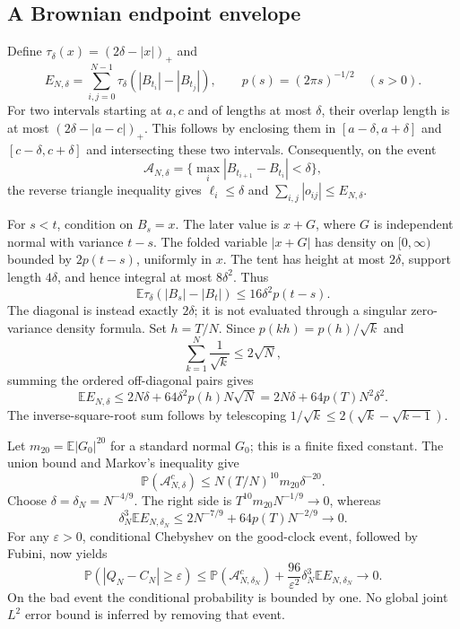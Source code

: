 \documentclass[11pt]{article}
\theoremstyle{remark}\newtheorem{remark}[theorem]{Remark}
\begin{document}
\subsection*{A Brownian endpoint envelope}
Define $\tau_\delta(x)=(2\delta-|x|)_+$ and
\[
 E_{N,\delta}=\sum_{i,j=0}^{N-1}
       \tau_\delta(|B_{t_i}|-|B_{t_j}|),\qquad
 p(s)=(2\pi s)^{-1/2}\quad(s>0).
\]
For two intervals starting at $a,c$ and of lengths at most
$\delta$, their overlap length is at most
$(2\delta-|a-c|)_+$. This follows by enclosing them in
$[a-\delta,a+\delta]$ and $[c-\delta,c+\delta]$ and intersecting
these two intervals. Consequently, on the event
\[
 \mathcal A_{N,\delta}
 =\{\max_i|B_{t_{i+1}}-B_{t_i}|<\delta\},
\]
the reverse triangle inequality gives $\ell_i\leq\delta$ and
$\sum_{i,j}|o_{ij}|\leq E_{N,\delta}$.

For $s<t$, condition on $B_s=x$. The later value is $x+G$, where
$G$ is independent normal with variance $t-s$. The folded variable
$|x+G|$ has density on $[0,\infty)$ bounded by $2p(t-s)$,
uniformly in $x$. The tent has height at most $2\delta$, support
length $4\delta$, and hence integral at most $8\delta^2$.
Thus
\begin{equation}\label{eq:tentmean}
 \mathbb E\tau_\delta(|B_s|-|B_t|)
 \leq16\delta^2p(t-s).
\end{equation}
The diagonal is instead exactly $2\delta$; it is not evaluated
through a singular zero-variance density formula. Set $h=T/N$.
Since $p(kh)=p(h)/\sqrt k$ and
\[
 \sum_{k=1}^{N}\frac1{\sqrt k}\leq2\sqrt N,
\]
summing the ordered off-diagonal pairs gives
\begin{equation}\label{eq:endpointenergy}
 \mathbb EE_{N,\delta}
 \leq2N\delta+64\delta^2p(h)N\sqrt N
 =2N\delta+64p(T)N^2\delta^2.
\end{equation}
The inverse-square-root sum follows by telescoping
$1/\sqrt k\leq2(\sqrt k-\sqrt{k-1})$.

Let $m_{20}=\mathbb E|G_0|^{20}$ for a standard normal $G_0$;
this is a finite fixed constant. The union bound and Markov's
inequality give
\begin{equation}\label{eq:badclock}
 \mathbb P(\mathcal A_{N,\delta}^c)
 \leq N(T/N)^{10}m_{20}\delta^{-20}.
\end{equation}
Choose $\delta=\delta_N=N^{-4/9}$. The right side is
$T^{10}m_{20}N^{-1/9}\to0$, whereas
\begin{equation}\label{eq:weightedenergy}
 \delta_N^3\mathbb EE_{N,\delta_N}
 \leq2N^{-7/9}+64p(T)N^{-2/9}\longrightarrow0.
\end{equation}
For any $\varepsilon>0$, conditional Chebyshev on the good-clock
event, followed by Fubini, now yields
\begin{equation}\label{eq:quarticfluctuation}
 \mathbb P(|Q_N-C_N|\geq\varepsilon)
 \leq\mathbb P(\mathcal A_{N,\delta_N}^c)
     +\frac{96}{\varepsilon^2}\delta_N^3\mathbb EE_{N,\delta_N}
 \longrightarrow0.
\end{equation}
On the bad event the conditional probability is bounded by one.
No global joint $L^2$ error bound is inferred by removing that event.
\end{document}
